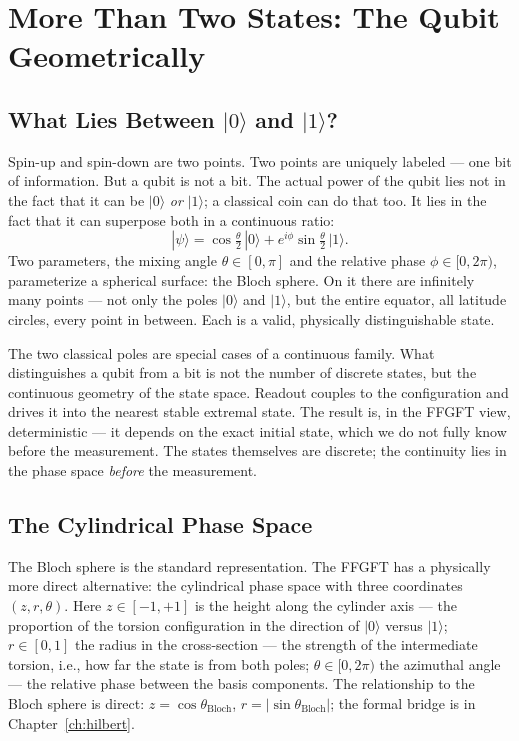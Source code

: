 \chapter{More Than Two States: The Qubit Geometrically}
\label{ch:qubit}

\section{What Lies Between $|0\rangle$ and $|1\rangle$?}

Spin-up and spin-down are two points. Two points are uniquely
labeled --- one bit of information. But a qubit is not a bit. The
actual power of the qubit lies not in the fact that it can be $|0\rangle$
\emph{or} $|1\rangle$; a classical coin can do that too.
It lies in the fact that it can superpose both in a continuous ratio:
\begin{equation}
  |\psi\rangle = \cos\tfrac{\theta}{2}\,|0\rangle
  + e^{i\phi}\sin\tfrac{\theta}{2}\,|1\rangle.
\end{equation}
Two parameters, the mixing angle $\theta\in[0,\pi]$ and the relative
phase $\phi\in[0,2\pi)$, parameterize a spherical surface: the
Bloch sphere. On it there are infinitely many points --- not only the
poles $|0\rangle$ and $|1\rangle$, but the entire equator, all
latitude circles, every point in between. Each is a valid,
physically distinguishable state.

\begin{keypoint}
The two classical poles are special cases of a continuous
family. What distinguishes a qubit from a bit is not the number of
discrete states, but the continuous geometry of the
state space. Readout couples to the configuration and drives it
into the nearest stable extremal state. The result is, in the FFGFT view, deterministic --- it depends on the exact initial state,
which we do not fully know before the measurement. The states
themselves are discrete; the continuity lies in the phase space \emph{before}
the measurement.
\end{keypoint}

\section{The Cylindrical Phase Space}

The Bloch sphere is the standard representation. The FFGFT has a
physically more direct alternative: the cylindrical phase space with
three coordinates $(z,r,\theta)$. Here $z\in[-1,+1]$ is the height
along the cylinder axis --- the proportion of the torsion configuration in
the direction of $|0\rangle$ versus $|1\rangle$; $r\in[0,1]$ the radius in the
cross-section --- the strength of the intermediate torsion, i.e., how far the
state is from both poles; $\theta\in[0,2\pi)$ the azimuthal angle
--- the relative phase between the basis components. The
relationship to the Bloch sphere is direct: $z = \cos\theta_{\mathrm{Bloch}}$,
$r = |\sin\theta_{\mathrm{Bloch}}|$; the formal bridge is in
Chapter~\ref{ch:hilbert}.

